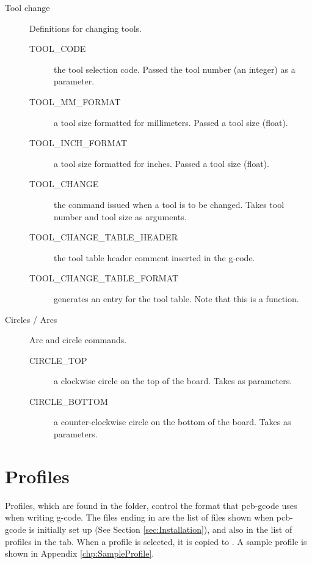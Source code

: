 \documentclass[11pt]{book}
\begin{document}
\begin{description}
\item[Tool change] Definitions for changing tools.
\begin{description}
	\item[TOOL\_{}CODE] the tool selection code. Passed the tool number (an integer) as a parameter.
	\item[TOOL\_{}MM\_{}FORMAT] a tool size formatted for millimeters. Passed a tool size (float).
	\item[TOOL\_{}INCH\_{}FORMAT] a tool size formatted for inches. Passed a tool size (float).
	\item[TOOL\_{}CHANGE] the command issued when a tool is to be changed. Takes tool number and tool size as arguments.
	\item[TOOL\_{}CHANGE\_{}TABLE\_{}HEADER] the tool table header comment inserted in the g-code.
	\item[TOOL\_{}CHANGE\_{}TABLE\_{}FORMAT] generates an entry for the tool table. Note that this is a function.
\end{description}

\item[Circles / Arcs] Arc and circle commands.
\begin{description}
	\item[CIRCLE\_{}TOP] a clockwise circle on the top of the board. Takes  as parameters.
	\item[CIRCLE\_{}BOTTOM] a counter-clockwise circle on the bottom of the board. Takes  as parameters.
\end{description}
\end{description}

%
%
\section{Profiles}\label{sec:Profiles}

Profiles, which are found in the  folder, control the format that pcb-gcode uses when writing g-code. The files ending in  are the list of files shown when pcb-gcode is initially set up (See Section \vref{sec:Installation}), and also in the list of profiles in the  tab. When a profile is selected, it is copied to . A sample profile is shown in Appendix \vref{chp:SampleProfile}. 
\end{document}
